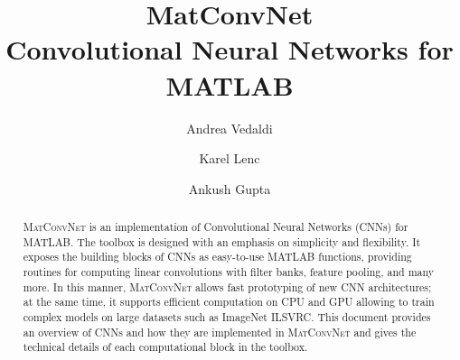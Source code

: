 \documentclass[12pt]{memoir}
\title{MatConvNet \\
\Large
Convolutional Neural Networks for MATLAB}
\author{
Andrea Vedaldi
\and
Karel Lenc
\and
Ankush Gupta
}
\date{}
\newcommand{\matconvnet}{\textsc{MatConvNet}\xspace}
\begin{document}


\frontmatter
\maketitle{}
\clearpage

\begin{abstract}
\matconvnet is an implementation of Convolutional Neural Networks (CNNs) for MATLAB. The toolbox is designed with an emphasis on simplicity and flexibility. It exposes the building blocks of CNNs as easy-to-use MATLAB functions, providing routines for computing linear convolutions with filter banks, feature pooling, and many more. In this manner, \matconvnet allows fast prototyping of new CNN architectures; at the same time, it supports efficient computation on CPU and GPU allowing to train complex models on large datasets such as ImageNet ILSVRC. This document provides an overview of CNNs and how they are implemented in \matconvnet and gives the technical details of each computational block in the toolbox.
\end{abstract}
\clearpage

\tableofcontents*
\clearpage

\mainmatter






\clearpage



\end{document}
